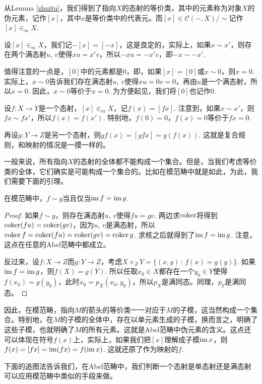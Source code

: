 \begin{para}
从Lemma \ref{zhuitu}，我们得到了指向$X$的态射的等价类，其中的元素称为对象$X$的伪元素，记作$[x]$，其中$x$是等价类中的代表元。而$[x]\in \mathcal{C}(-,X)/\sim$记作$[x]\in_m X$. 

设$[x]\in_m X$，我们记$-[x]=[-x]$，这是良定的，实际上，如果$x\sim x'$，则存在两个满态射$u$, $v$使得$xu=x'v$，所以$-xu=-x'v$，即$-x\sim -x'$. 

值得注意的一点是，$[0]$中的元素都是$0$，即，如果$[x]=[0]$或$x\sim 0$，则$x=0$. 实际上，$x\sim 0$告诉我们存在满态射$u$, $v$使得$xu=0v=0$，再由$u$是一个满态射，所以$x=0$. 因此，$x\sim 0$等价于$x=0$. 为方便起见，我们将$[0]$也记作$0$.

设$f:X\to Y$是一个态射，$[x]\in_m X$，记$f(x)=[fx]$. 注意到，如果$x\sim x'$，则$fx\sim fx'$，所以$f(x)=f(x')$. 特别地，$f(0)=0$，$f(x)=0$等价于$fx=0$.

再设$g:Y\to Z$是另一个态射，则$gf(x)=[gfx]=g(f(x))$. 这就是复合规则，和映射的情况是一摸一样的。
\end{para}

一般来说，所有指向$X$的态射的全体都不能构成一个集合。但是，当我们考虑等价类的全体，它们确实是可能构成一个集合的。比如在模范畴中就是如此，为此，我们需要下面的引理。

\begin{lem}
在模范畴中，$f\sim g$当且仅当$\operatorname{im} f = \operatorname{im} g$.
\end{lem}

\begin{proof}
如果$f\sim g$，则存在满态射$u$, $v$使得$fu=gv$. 两边求$\operatorname{coker}$将得到$\operatorname{coker}(fu)=\operatorname{coker}(gv)$，因为$u$, $v$是满态射，所以$\operatorname{coker} f=\operatorname{coker}(fu)=\operatorname{coker}(gv)=\operatorname{coker} g$. 求核之后就得到了$\operatorname{im} f=\operatorname{im} g$. 注意，这点在任意的Abel范畴中都成立。

反过来，设$f:X\to Z$而$g:Y\to Z$，考虑$X\times_Z Y=\{(x,y)\,:\,f(x)=g(y)\}$. 如果$\operatorname{im} f=\operatorname{im} g$，则$f(X)=g(Y)$. 所以任取$x_0\in X$都存在一个$y_0\in Y$使得$f(x_0)=g(y_0)$，此时$x_0=p_X(x_0,y_0)$，所以$p_X$是满同态。同理，$p_Y$是满同态。
\end{proof}

因此，在模范畴，指向$M$的箭头的等价类一一对应于$M$的子模，这当然构成一个集合。特别地，在$M$的子模的全体中，存在以单元素生成的子模，换而言之，明确了这些子模，也就明确了$M$的所有元素。这就是Abel范畴中伪元素的含义。这点还可以体现在符号$f(x)$上，实际上，如果我们把$[x]$理解成子模$\operatorname{im} x$，则$f(x)=[fx]=\operatorname{im}(f x)=f(\operatorname{im} x)$. 这就还原了作为映射的$f$. 

下面的追图法告诉我们，在Abel范畴中，我们判断一个态射是单态射还是满态射可以应用模范畴中类似的手段来做。

